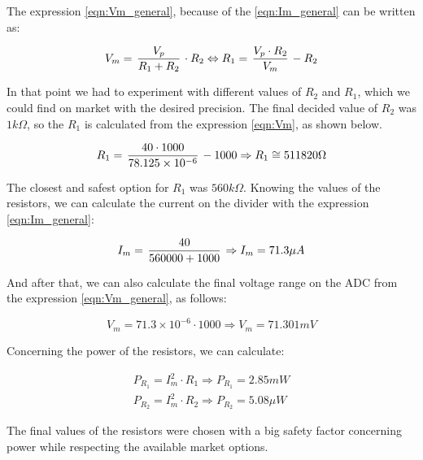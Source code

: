 The expression \ref{eqn:Vm_general}, because of the \ref{eqn:Im_general} can be written as:

\begin{equation}
V_m = \left. V_p \over R_1 + R_2 \right. \cdot R_2 \Leftrightarrow R_1 = \left. V_p \cdot R_2 \over V_m \right. - R_2
\label{eqn:Vm}
\end{equation}

In that point we had to experiment with different values of $R_2$ and $R_1$, which we could find on market with the desired precision. The final decided value of $R_2$ was $1k\Omega$, so the $R_1$ is calculated from the expression \ref{eqn:Vm}, as shown below. 

\begin{equation}
R_1 = \left. 40 \cdot 1000 \over 78.125 \times 10^{-6} \right. - 1000 \Rightarrow R_1 \cong 511820\Omega
\label{eqn:R1_calculation}
\end{equation}

The closest and safest option for $R_1$ was $560k\Omega$. Knowing the values of the resistors, we can
calculate the current on the divider with the expression \ref{eqn:Im_general}:

\begin{equation}
I_m = \left. 40 \over 560000 + 1000 \right. \Rightarrow I_m = 71.3\mu A
\label{eqn:Im_calculation}
\end{equation}

And after that, we can also calculate the final voltage range on the ADC from the expression \ref{eqn:Vm_general}, as follows:

\begin{equation}
V_m = 71.3 \times 10^{-6} \cdot 1000 \Rightarrow V_m = 71.301mV
\label{eqn:Vm_calculation}
\end{equation}

Concerning the power of the resistors, we can calculate:

\begin{equation}
\begin{split}
P_{R_1} = I_m^2 \cdot R_1 \Rightarrow P_{R_1} = 2.85mW \\
P_{R_2} = I_m^2 \cdot R_2 \Rightarrow P_{R_2} = 5.08\mu W
\end{split}
\label{eqn:Resistor_power}
\end{equation}

The final values of the resistors were chosen with a big safety factor concerning power while respecting the available market options.\\

